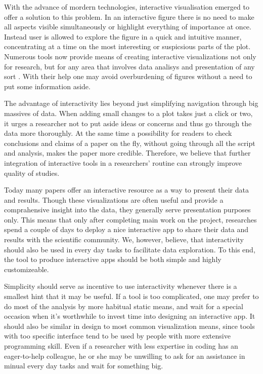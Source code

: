 \documentclass[twocolumn,10pt]{article}
\begin{document}
With the advance of mordern technologies, interactive visualisation emerged to offer a solution to this problem. In an interactive figure there is no need to make all aspects visible simultaneously or highlight everything of importance at once. Instead user is allowed to explore the figure in a quick and intuitive manner, concentrating at a time on the most interesting or suspicsious parts of the plot. Numerous tools now provide means of creating interactive visualizations not only for research, but for any area that involves data analisys and presentation of any sort \citep{caldarola_2017}. With their help one may avoid overburdening of figures without a need to put some information aside.

The advantage of interactivity lies beyond just simplifying navigation through big massives of data. When adding small changes to a plot takes just a click or two, it urges a researcher not to put aside ideas or concerns and thus go through the data more thoroughly. At the same time a possibility for readers to check conclusions and claims of a paper on the fly, without going through all the script and analysis, makes the paper more credible. Therefore, we believe that further integration of interactive tools in a researchers' routine can strongly improve quality of studies.

Today many papers offer an interactive resource as a way to present their data and results. Though these visualizations are often useful and provide a comprahensive insight into the data, they generally serve presentation purposes only. This means that only after completing main work on the project, researches spend a couple of days to deploy a nice interactive app to share their data and results with the scientific community. We, however, believe, that interactivity should also be used in every day tasks to facilitate data exploration. To this end, the tool to produce interactive apps should be both simple and highly customizeable.

Simplicity should serve as incentive to use interactivity whenever there is a smallest hint that it may be useful. If a tool is too complicated, one may prefer to do most of the analysis by more habitual static means, and wait for a special occasion when it's worthwhile to invest time into designing an interactive app. It should also be similar in design to most common visualization means, since tools with too specific interface tend to be used by people with more extensive programming skill. Even if a researcher with less expertise in coding has an eager-to-help colleague, he or she may be unwilling to ask for an assistance in minual every day tasks and wait for something big.
\end{document}
